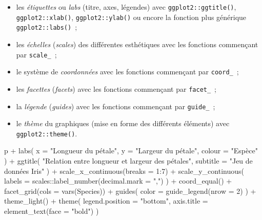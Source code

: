 \documentclass[
  letterpaper,
  DIV=11,
  numbers=noendperiod,
  oneside]{scrreprt}
\newenvironment{Shaded}{\begin{snugshade}}{\end{snugshade}}
\newcommand{\AttributeTok}[1]{\textcolor[rgb]{0.40,0.45,0.13}{#1}}
\newcommand{\DecValTok}[1]{\textcolor[rgb]{0.68,0.00,0.00}{#1}}
\newcommand{\FunctionTok}[1]{\textcolor[rgb]{0.28,0.35,0.67}{#1}}
\newcommand{\NormalTok}[1]{\textcolor[rgb]{0.00,0.23,0.31}{#1}}
\newcommand{\SpecialCharTok}[1]{\textcolor[rgb]{0.37,0.37,0.37}{#1}}
\newcommand{\StringTok}[1]{\textcolor[rgb]{0.13,0.47,0.30}{#1}}
\providecommand{\tightlist}{%
  \setlength{\itemsep}{0pt}\setlength{\parskip}{0pt}}\usepackage{longtable,booktabs,array}
\begin{document}
\begin{itemize}
\tightlist
\item
  les \emph{étiquettes} ou \emph{labs} (titre, axes, légendes) avec
  \texttt{ggplot2::ggtitle()}, \texttt{ggplot2::xlab()},
  \texttt{ggplot2::ylab()} ou encore la fonction plus générique
  \texttt{ggplot2::labs()}~;
\item
  les \emph{échelles} (\emph{scales}) des différentes esthétiques avec
  les fonctions commençant par \texttt{scale\_}~;
\item
  le système de \emph{coordonnées} avec les fonctions commençant par
  \texttt{coord\_}~;
\item
  les \emph{facettes} (\emph{facets}) avec les fonctions commençant par
  \texttt{facet\_}~;
\item
  la \emph{légende} (\emph{guides}) avec les fonctions commençant par
  \texttt{guide\_}~;
\item
  le \emph{thème} du graphiques (mise en forme des différents éléments)
  avec \texttt{ggplot2::theme()}.
\end{itemize}

\begin{Shaded}
\begin{Highlighting}[]
\NormalTok{p }\SpecialCharTok{+}
  \FunctionTok{labs}\NormalTok{(}
    \AttributeTok{x =} \StringTok{"Longueur du pétale"}\NormalTok{,}
    \AttributeTok{y =} \StringTok{"Largeur du pétale"}\NormalTok{,}
    \AttributeTok{colour =} \StringTok{"Espèce"}
\NormalTok{  ) }\SpecialCharTok{+}
  \FunctionTok{ggtitle}\NormalTok{(}
    \StringTok{"Relation entre longueur et largeur des pétales"}\NormalTok{,}
    \AttributeTok{subtitle =} \StringTok{"Jeu de données Iris"}
\NormalTok{  ) }\SpecialCharTok{+}
  \FunctionTok{scale\_x\_continuous}\NormalTok{(}\AttributeTok{breaks =} \DecValTok{1}\SpecialCharTok{:}\DecValTok{7}\NormalTok{) }\SpecialCharTok{+}
  \FunctionTok{scale\_y\_continuous}\NormalTok{(}
    \AttributeTok{labels =}\NormalTok{ scales}\SpecialCharTok{::}\FunctionTok{label\_number}\NormalTok{(}\AttributeTok{decimal.mark =} \StringTok{","}\NormalTok{)}
\NormalTok{  ) }\SpecialCharTok{+}
  \FunctionTok{coord\_equal}\NormalTok{() }\SpecialCharTok{+}
  \FunctionTok{facet\_grid}\NormalTok{(}\AttributeTok{cols =} \FunctionTok{vars}\NormalTok{(Species)) }\SpecialCharTok{+}
  \FunctionTok{guides}\NormalTok{(}
    \AttributeTok{color =} \FunctionTok{guide\_legend}\NormalTok{(}\AttributeTok{nrow =} \DecValTok{2}\NormalTok{)}
\NormalTok{  ) }\SpecialCharTok{+}
  \FunctionTok{theme\_light}\NormalTok{() }\SpecialCharTok{+}
  \FunctionTok{theme}\NormalTok{(}
    \AttributeTok{legend.position =} \StringTok{"bottom"}\NormalTok{,}
    \AttributeTok{axis.title =} \FunctionTok{element\_text}\NormalTok{(}\AttributeTok{face =} \StringTok{"bold"}\NormalTok{)}
\NormalTok{  )}
\end{Highlighting}
\end{Shaded}
\end{document}
